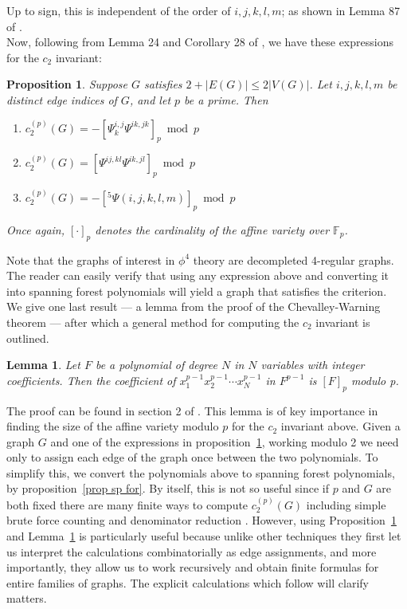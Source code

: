 \documentclass[12pt]{amsart}
\newtheorem{lemma}[definition]{Lemma}
\newtheorem{proposition}[definition]{Proposition}
\numberwithin{definition}{section}
\begin{document}
Up to sign, this is independent of the order of $i,j,k,l,m$; as shown in Lemma 87 of \cite{Brown2009}.\\
Now, following from Lemma 24 and Corollary 28 of \cite{BrownSchnetz2012}, we have these expressions for the $c_2$ invariant:
\begin{proposition}\label{prop calculate c2}
	Suppose $G$ satisfies $2+|E(G)| \leq 2|V(G)|$. Let $i,j,k,l,m$ be distinct edge indices of $G$, and let $p$ be a prime. Then
	\begin{enumerate}
	\item $c_2^{(p)}(G)=-[\Psi_k^{i,j}\Psi^{ik,jk}]_p \bmod p$
	\item $c_2^{(p)}(G)=[\Psi^{ij,kl}\Psi^{ik,jl}]_p \bmod p$
	\item $c_2^{(p)}(G)=-[^5\Psi(i,j,k,l,m)]_p \bmod p$
	\end{enumerate}
	Once again, $[\cdot]_p$ denotes the cardinality of the affine variety over $\mathds{F}_p$. 
\end{proposition}
Note that the graphs of interest in $\phi^4$ theory are decompleted 4-regular graphs. The reader can easily verify that using any expression above and converting it into spanning forest polynomials will yield a graph that satisfies the criterion. \\
We give one last result --- a lemma from the proof of the Chevalley-Warning theorem --- after which a general method for computing the $c_2$ invariant is outlined.
\begin{lemma}\label{lem c2 coeff}
	Let $F$ be a polynomial of degree $N$ in $N$ variables with integer coefficients. Then the coefficient of $x_1^{p-1}x_2^{p-1}\cdots x_N^{p-1}$ in $F^{p-1}$ is $[F]_p$ modulo p. 
\end{lemma}
The proof can be found in section 2 of \cite{Ax1964}. This lemma is of key importance in finding the size of the affine variety modulo $p$ for the $c_2$ invariant above. Given a graph $G$ and one of the expressions in proposition~\ref{prop calculate c2}, working modulo 2 we need only to assign each edge of the graph once between the two polynomials. To simplify this, we convert the polynomials above to spanning forest polynomials, by proposition~\ref{prop sp for}. By itself, this is not so useful since if $p$ and $G$ are both fixed there are many finite ways to compute $c_2^{(p)}(G)$ including simple brute force counting and denominator reduction \cite{BrownSchnetz2012}.  However, using Proposition~\ref{prop calculate c2} and Lemma~\ref{lem c2 coeff} is particularly useful because unlike other techniques they first let us interpret the calculations combinatorially as edge assignments, and more importantly, they allow us to work recursively and obtain finite formulas for entire families of graphs. The explicit calculations which follow will clarify matters. 
\end{document}
